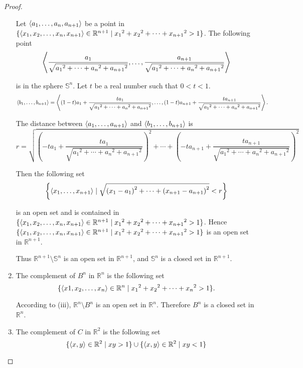 \begin{proof}
\begin{enumerate}[label={(\roman*)}]
		      Let $\left\langle{a_{1}, \ldots, a_{n}, a_{n+1}}\right\rangle$ be a point in $ \{ \left\langle{x_{1}, x_{2}, \ldots, x_{n}, x_{n+1}}\right\rangle \in \mathbb{R}^{n+1} \mid {x_{1}}^{2} + {x_{2}}^{2} + \cdots + {x_{n+1}}^{2} > 1 \}$. The following point
		      \[
			      \left\langle{\frac{a_{1}}{\sqrt{{a_{1}}^{2} + \cdots + {a_{n}}^{2} + {a_{n+1}}^{2}}}, \ldots, \frac{a_{n+1}}{\sqrt{{a_{1}}^{2} + \cdots + {a_{n}}^{2} + {a_{n+1}}^{2}}}}\right\rangle
		      \]

		      is in the sphere $\mathbb{S}^{n}$. Let $t$ be a real number such that $0 < t < 1$.
		      \[
			      \left\langle{b_{1}, \ldots, b_{n+1}}\right\rangle = \left\langle{(1-t)a_{1} + \frac{ta_{1}}{\sqrt{{a_{1}}^{2} + \cdots + {a_{n}}^{2} + {a_{n+1}}^{2}}}, \ldots, (1-t)a_{n+1} + \frac{ta_{n+1}}{\sqrt{{a_{1}}^{2} + \cdots + {a_{n}}^{2} + {a_{n+1}}^{2}}}}\right\rangle.
		      \]

		      The distance between $\left\langle{a_{1}, \ldots, a_{n+1}}\right\rangle$ and $\left\langle{b_{1}, \ldots, b_{n+1}}\right\rangle$ is
		      \[
			      r = \sqrt{{\left(-ta_{1} + \frac{ta_{1}}{\sqrt{{a_{1}}^{2} + \cdots + {a_{n}}^{2} + {a_{n+1}}^{2}}}\right)}^{2} + \cdots + {\left(-ta_{n+1} + \frac{ta_{n+1}}{\sqrt{{a_{1}}^{2} + \cdots + {a_{n}}^{2} + {a_{n+1}}^{2}}}\right)}^{2}}
		      \]

		      Then the following set
		      \[
			      \left\{ \left\langle{x_{1}, \ldots, x_{n+1}}\right\rangle \mid \sqrt{{(x_{1} - a_{1})}^{2} + \cdots + {(x_{n+1} - a_{n+1})}^{2}} < r \right\}
		      \]

		      is an open set and is contained in $\{ \left\langle{x_{1}, x_{2}, \ldots, x_{n}, x_{n+1}}\right\rangle \in \mathbb{R}^{n+1} \mid {x_{1}}^{2} + {x_{2}}^{2} + \cdots + {x_{n+1}}^{2} > 1 \}$. Hence $\{ \left\langle{x_{1}, x_{2}, \ldots, x_{n}, x_{n+1}}\right\rangle \in \mathbb{R}^{n+1} \mid {x_{1}}^{2} + {x_{2}}^{2} + \cdots + {x_{n+1}}^{2} > 1 \}$ is an open set in $\mathbb{R}^{n+1}$.

		      Thus $\mathbb{R}^{n+1}\setminus\mathbb{S}^{n}$ is an open set in $\mathbb{R}^{n+1}$, and $\mathbb{S}^{n}$ is a closed set in $\mathbb{R}^{n+1}$.
		\item The complement of $B^{n}$ in $\mathbb{R}^{n}$ is the following set
		      \[
			      \{ \left\langle{x{1}, x_{2}, \ldots, x_{n}}\right\rangle\in \mathbb{R}^{n} \mid {x_{1}}^{2} + {x_{2}}^{2} + \cdots + {x_{n}}^{2} > 1 \}.
		      \]

		      According to (iii), $\mathbb{R}^{n}\setminus B^{n}$ is an open set in $\mathbb{R}^{n}$. Therefore $B^{n}$ is a closed set in $\mathbb{R}^{n}$.
		\item The complement of $C$ in $\mathbb{R}^{2}$ is the following set
		      \[
			      \{ \left\langle{x, y}\right\rangle\in \mathbb{R}^{2} \mid xy > 1 \} \cup \{ \left\langle{x, y}\right\rangle\in \mathbb{R}^{2} \mid xy < 1 \}
		      \]


\end{enumerate}
\end{proof}
